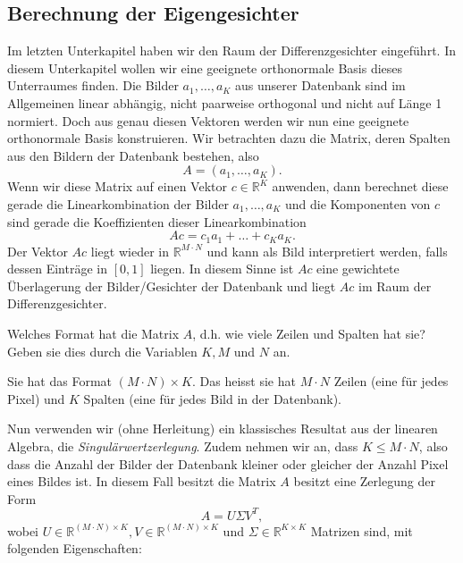 \subsection{Berechnung der Eigengesichter}
Im letzten Unterkapitel haben wir den Raum der Differenzgesichter eingeführt.
In diesem Unterkapitel wollen wir eine geeignete orthonormale Basis dieses Unterraumes finden.
Die Bilder $a_1,\ldots,a_K$ aus unserer Datenbank sind im Allgemeinen linear abhängig, nicht paarweise orthogonal und nicht auf Länge 1 normiert.
Doch aus genau diesen Vektoren werden wir nun eine geeignete orthonormale Basis konstruieren. Wir betrachten dazu die Matrix, deren Spalten aus den Bildern der Datenbank bestehen, also
\begin{equation*}
	A=\left(a_1,\ldots,a_K\right).
\end{equation*}
Wenn wir diese Matrix auf einen Vektor $c\in\mathbb R^K$ anwenden, dann berechnet diese gerade die Linearkombination der Bilder $a_1,\ldots,a_K$ und die Komponenten von $c$ sind gerade die Koeffizienten dieser Linearkombination
\begin{equation*}
	Ac=c_1a_1+\ldots+c_Ka_K.
\end{equation*}
Der Vektor $Ac$ liegt wieder in $\mathbb R^{M\cdot N}$ und kann als Bild interpretiert werden, falls dessen Einträge in $\left[0,1\right]$ liegen.
In diesem Sinne ist $Ac$ eine gewichtete Überlagerung der Bilder/Gesichter der Datenbank und liegt $Ac$ im Raum der Differenzgesichter.
\begin{aufgabe}
	Welches Format hat die Matrix $A$, d.h. wie viele Zeilen und Spalten hat sie?
	Geben sie dies durch die Variablen $K,M$ und $N$ an. 
\end{aufgabe}
\begin{losung*}
	Sie hat das Format $\left(M\cdot N\right)\times K$.
	Das heisst sie hat $M\cdot N$ Zeilen (eine für jedes Pixel) und $K$ Spalten (eine für jedes Bild in der Datenbank).
\end{losung*}
Nun verwenden wir (ohne Herleitung) ein klassisches Resultat aus der linearen Algebra, die \textit{Singulärwertzerlegung}.
Zudem nehmen wir an, dass $K\leq M\cdot N$, also dass die Anzahl der Bilder der Datenbank kleiner oder gleicher der Anzahl Pixel eines Bildes ist.
In diesem Fall besitzt die Matrix $A$ besitzt eine Zerlegung der Form
\begin{equation*}
	A=U\Sigma V^T,
\end{equation*}
wobei $U\in\mathbb R^{\left(M\cdot N\right)\times K},V\in\mathbb R^{\left(M\cdot N\right)\times K}$ und $\Sigma\in\mathbb R^{K\times K}$ Matrizen sind, mit folgenden Eigenschaften:
